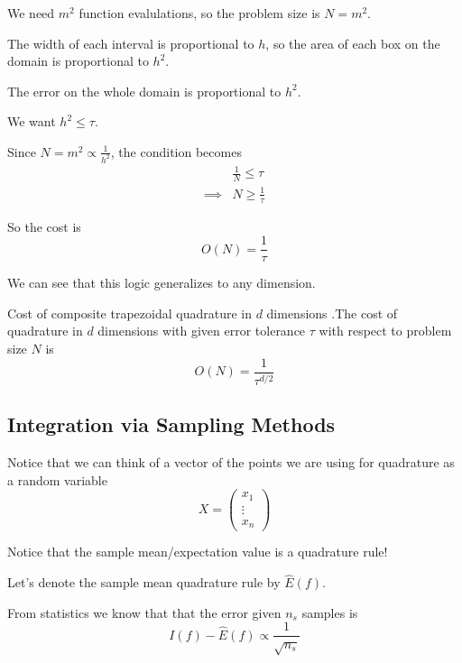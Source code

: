 \documentclass[12pt,letterpaper]{article}
\begin{document}
We need $m^2$ function evalulations, so the problem size is $N = m^2$.

The width of each interval is proportional to $h$, so the area of each box on the domain is proportional to $h^2$.

The error on the whole domain is proportional to $h^2$.

We want $h^2 \leq \tau$.

Since $N = m^2 \propto \frac{1}{h^2}$, the condition becomes
\begin{align}
	& \frac{1}{N} \leq \tau \\
	\implies & N \geq \frac{1}{\tau}
\end{align}

So the cost is
\begin{equation}
	O(N) = \frac{1}{\tau}
\end{equation}

We can see that this logic generalizes to any dimension.

\begin{theo}{Cost of composite trapezoidal quadrature in $d$ dimensions}
.The cost of quadrature in $d$ dimensions with given error tolerance $\tau$ with respect to problem size $N$ is
\begin{equation}
	O(N) = \frac{1}{\tau^{d/2}}
\end{equation}
\label{thm:quad_d_dim}
\end{theo}

\subsection{Integration via Sampling Methods}
Notice that we can think of a vector of the points we are using for quadrature as a random variable
\begin{equation}
X = \begin{pmatrix}
	x_1 \\ \vdots \\ x_n
\end{pmatrix}
\end{equation}

Notice that the sample mean/expectation value is a quadrature rule!

Let's denote the sample mean quadrature rule by $\hat{E}(f)$.

From statistics we know that that the error given $n_s$ samples is
\begin{equation}
	I(f) - \hat{E}(f) \propto \frac{1}{\sqrt{n_s}}
\end{equation}
\end{document}
